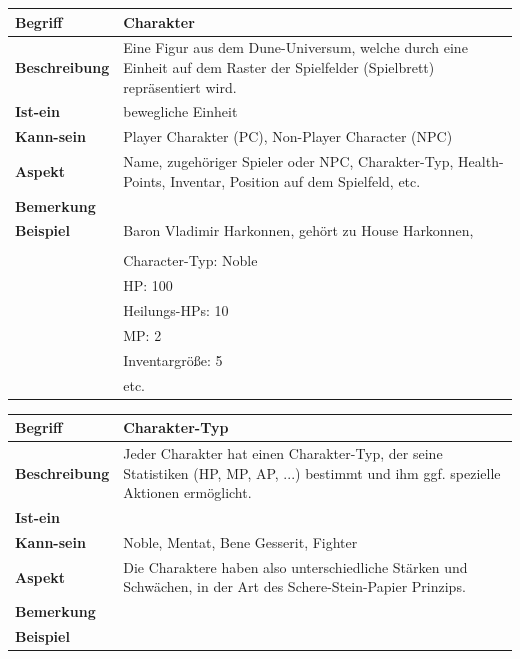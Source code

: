 \documentclass{uulm-assignment}
\begin{document}
\begin{tabularx}{16cm}{|l|X|}
\hline
\textbf{Begriff} & \textbf{Charakter} \\
\hline
\textbf{Beschreibung} & Eine Figur aus dem Dune-Universum, welche durch eine Einheit auf dem Raster der Spielfelder (Spielbrett) repräsentiert wird. \\
\hline
\textbf{Ist-ein} & bewegliche Einheit \\
\hline
\textbf{Kann-sein} & Player Charakter (PC), Non-Player Character (NPC) \\
\hline
\textbf{Aspekt} & Name, zugehöriger Spieler oder NPC, Charakter-Typ, Health-Points, Inventar, Position auf dem Spielfeld, etc. \\
\hline
\textbf{Bemerkung} &  \\
\hline
\textbf{Beispiel} & Baron Vladimir Harkonnen, gehört zu House Harkonnen, \\
\\
& Character-Typ: Noble \\
& HP: 100 \\
& Heilungs-HPs: 10 \\
& MP: 2 \\
& Inventargröße: 5 \\
& etc. \\
\hline
\end{tabularx}

\begin{tabularx}{16cm}{|l|X|}
\hline
\textbf{Begriff} & \textbf{Charakter-Typ} \\
\hline
\textbf{Beschreibung} & Jeder Charakter hat einen Charakter-Typ, der seine Statistiken (HP, MP, AP, ...) bestimmt und ihm ggf. spezielle Aktionen ermöglicht. \\
\hline
\textbf{Ist-ein} & \\
\hline
\textbf{Kann-sein} & Noble, Mentat, Bene Gesserit, Fighter\\
\hline
\textbf{Aspekt} & Die Charaktere haben also unterschiedliche Stärken und Schwächen, in der Art des Schere-Stein-Papier Prinzips.\\
\hline
\textbf{Bemerkung} &  \\
\hline
\textbf{Beispiel} &  \\
\hline
\end{tabularx}
\end{document}

